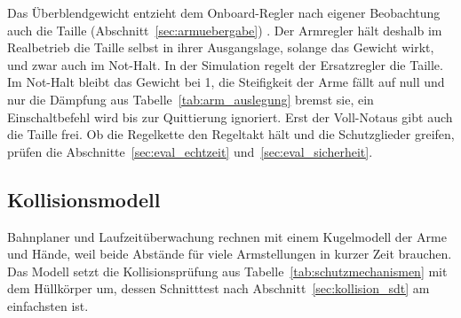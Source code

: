 Das Überblendgewicht entzieht dem Onboard-Regler nach eigener Beobachtung auch die Taille (Abschnitt~\ref{sec:armuebergabe}) .
Der Armregler hält deshalb im Realbetrieb die Taille selbst in ihrer Ausgangslage, solange das Gewicht wirkt, und zwar auch im Not-Halt. In der Simulation regelt der Ersatzregler die Taille.
Im Not-Halt bleibt das Gewicht bei 1, die Steifigkeit der Arme fällt auf null und nur die Dämpfung aus Tabelle~\ref{tab:arm_auslegung} bremst sie, ein Einschaltbefehl wird bis zur Quittierung ignoriert.
Erst der Voll-Notaus gibt auch die Taille frei.
Ob die Regelkette den Regeltakt hält und die Schutzglieder greifen, prüfen die Abschnitte~\ref{sec:eval_echtzeit} und~\ref{sec:eval_sicherheit}.




\subsection{Kollisionsmodell}
\label{sec:kollisionsmodell}

Bahnplaner und Laufzeitüberwachung rechnen mit einem Kugelmodell der Arme und Hände, weil beide Abstände für viele Armstellungen in kurzer Zeit brauchen.
Das Modell setzt die Kollisionsprüfung aus Tabelle~\ref{tab:schutzmechanismen} mit dem Hüllkörper um, dessen Schnitttest nach Abschnitt~\ref{sec:kollision_sdt} am einfachsten ist.

